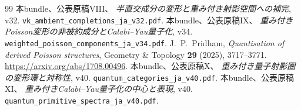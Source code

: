 \begin{thebibliography}{99}
 本bundle、公表原稿VIII、
\emph{半直交成分の変形と重み付き射影空間への補完}, v32.
\nolinkurl{vk_ambient_completions_ja_v32.pdf}.
 本bundle、公表原稿IX、
\emph{重み付きPoisson変形の非被約成分とCalabi--Yau量子化}, v34.
\nolinkurl{weighted_poisson_components_ja_v34.pdf}.
J.~P.~Pridham, \emph{Quantisation of derived Poisson structures},
Geometry \& Topology \textbf{29} (2025), 3717--3771.
\url{https://arxiv.org/abs/1708.00496}.
 本bundle、公表原稿X、
\emph{重み付き量子射影圏の変形環と対称性}, v40.
\nolinkurl{quantum_categories_ja_v40.pdf}.
 本bundle、公表原稿XI、
\emph{重み付きCalabi--Yau量子化の中心と表現}, v40.
\nolinkurl{quantum_primitive_spectra_ja_v40.pdf}.












\end{thebibliography}

